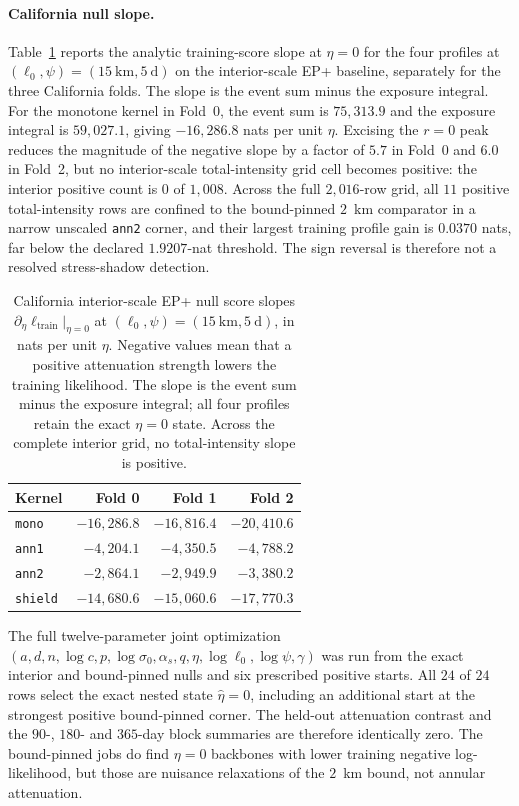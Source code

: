 \paragraph{California null slope.}
Table~\ref{tab:pathway1-null-slopes} reports the analytic training-score slope at $\eta=0$ for the four profiles at $(\ell_0,\psi)=(15~\mathrm{km},5~\mathrm{d})$ on the interior-scale EP+ baseline, separately for the three California folds. The slope is the event sum minus the exposure integral. For the monotone kernel in Fold~0, the event sum is $75{,}313.9$ and the exposure integral is $59{,}027.1$, giving $-16{,}286.8$ nats per unit $\eta$. Excising the $r=0$ peak reduces the magnitude of the negative slope by a factor of $5.7$ in Fold~0 and $6.0$ in Fold~2, but no interior-scale total-intensity grid cell becomes positive: the interior positive count is $0$ of $1{,}008$. Across the full $2{,}016$-row grid, all $11$ positive total-intensity rows are confined to the bound-pinned $2$~km comparator in a narrow unscaled \texttt{ann2} corner, and their largest training profile gain is $0.0370$ nats, far below the declared $1.9207$-nat threshold. The sign reversal is therefore not a resolved stress-shadow detection.

\begin{table}[htbp]\centering\small
\setlength{\tabcolsep}{10pt}
\begin{tabular}{@{}lrrr@{}}\toprule
Kernel & Fold 0 & Fold 1 & Fold 2\\\midrule
\texttt{mono} & $-16{,}286.8$ & $-16{,}816.4$ & $-20{,}410.6$\\
\texttt{ann1} & $-4{,}204.1$ & $-4{,}350.5$ & $-4{,}788.2$\\
\texttt{ann2} & $-2{,}864.1$ & $-2{,}949.9$ & $-3{,}380.2$\\
\texttt{shield} & $-14{,}680.6$ & $-15{,}060.6$ & $-17{,}770.3$\\
\bottomrule\end{tabular}
\caption{California interior-scale EP+ null score slopes $\partial_\eta\ell_{\mathrm{train}}|_{\eta=0}$ at $(\ell_0,\psi)=(15~\mathrm{km},5~\mathrm{d})$, in nats per unit $\eta$. Negative values mean that a positive attenuation strength lowers the training likelihood. The slope is the event sum minus the exposure integral; all four profiles retain the exact $\eta=0$ state. Across the complete interior grid, no total-intensity slope is positive.}
\label{tab:pathway1-null-slopes}
\end{table}

The full twelve-parameter joint optimization $(a,d,n,\log c,p,\log\sigma_0,\alpha_s,q,\eta,\log\ell_0,\log\psi,\gamma)$ was run from the exact interior and bound-pinned nulls and six prescribed positive starts. All $24$ of $24$ rows select the exact nested state $\hat\eta=0$, including an additional start at the strongest positive bound-pinned corner. The held-out attenuation contrast and the $90$-, $180$- and $365$-day block summaries are therefore identically zero. The bound-pinned jobs do find $\eta=0$ backbones with lower training negative log-likelihood, but those are nuisance relaxations of the $2$~km bound, not annular attenuation.

